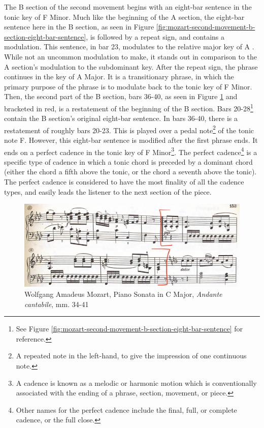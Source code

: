 The B section of the second movement begins with an eight-bar sentence in the tonic key of F Minor. Much like the beginning of the A section, the eight-bar sentence here in the B section, as seen in Figure \ref{fig:mozart-second-movement-b-section-eight-bar-sentence}\autocite{Henle_1977}, is followed by a repeat sign, and contains a modulation. This sentence, in bar 23, modulates to the relative major key of A \musFlat{}. While not an uncommon modulation to make, it stands out in comparison to the A section's modulation to the subdominant key. After the repeat sign, the phrase continues in the key of A\musFlat{} Major. It is a transitionary phrase, in which the primary purpose of the phrase is to modulate back to the tonic key of F Minor. Then, the second part of the B section, bars 36-40, as seen in Figure \ref{fig:mozart-second-movement-second-half-b-section}\autocite{Henle_1977} and bracketed in red, is a restatement of the beginning of the B section. Bars 20-28\footnote{See Figure \ref{fig:mozart-second-movement-b-section-eight-bar-sentence} for reference.} contain the B section's original eight-bar sentence. In bars 36-40, there is a restatement of roughly bars 20-23. This is played over a pedal note\footnote{A repeated note in the left-hand, to give the impression of one continuous note.} of the tonic note F. However, this eight-bar sentence is modified after the first phrase ends. It ends on a perfect cadence\autocite{Nagley_Whittall_2011} in the tonic key of F Minor\footnote{A cadence is known as a melodic or harmonic motion which is conventionally associated with the ending of a phrase, section, movement, or piece.}. The perfect cadence\footnote{Other names for the perfect cadence include the final, full, or complete cadence, or the full close.} is a specific type of cadence in which a tonic chord is preceded by a dominant chord (either the chord a fifth above the tonic, or the chord a seventh above the tonic). The perfect cadence is considered to have the most finality of all the cadence types, and easily leads the listener to the next section of the piece.

\begin{figure}
	\centering
	\includegraphics[width=\textwidth]{figures/mozart-second-movement-second-half-b-section.jpg}
	\caption{Wolfgang Amadeus Mozart, Piano Sonata in C Major, \textit{Andante cantabile}, mm. 34-41}
	\label{fig:mozart-second-movement-second-half-b-section}
\end{figure}

